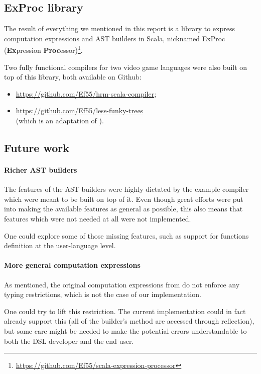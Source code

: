 \subsection{ExProc library}
The result of everything we mentioned in this report is a library to express computation expressions and AST builders in Scala, nicknamed ExProc (\textbf{Ex}pression \textbf{Proc}essor)\footnote{\url{https://github.com/Ef55/scala-expression-processor}}.

Two fully functional compilers for two video game languages were also built on top of this library, both available on Github:
\begin{itemize}
    \item \url{https://github.com/Ef55/hrm-scala-compiler};
    \item \url{https://github.com/Ef55/less-funky-trees}\\ (which is an adaptation of \cite{less-funky-trees}).
\end{itemize}

\subsection{Future work}

\paragraph{Richer AST builders}
The features of the AST builders were highly dictated by the example compiler which were meant to be built on top of it.
Even though great efforts were put into making the available features as general as possible, 
this also means that features which were not needed at all were not implemented.

One could explore some of those missing features,
such as support for functions definition at the user-language level.

\paragraph{More general computation expressions}
As mentioned, the original computation expressions from \Fsharp{} do not enforce any typing restrictions, which is not the case of our implementation.

One could try to lift this restriction. The current implementation could in fact already support this (all of the builder's method are accessed through reflection), but some care might be needed to make the potential errors understandable to both the DSL developer and the end user.